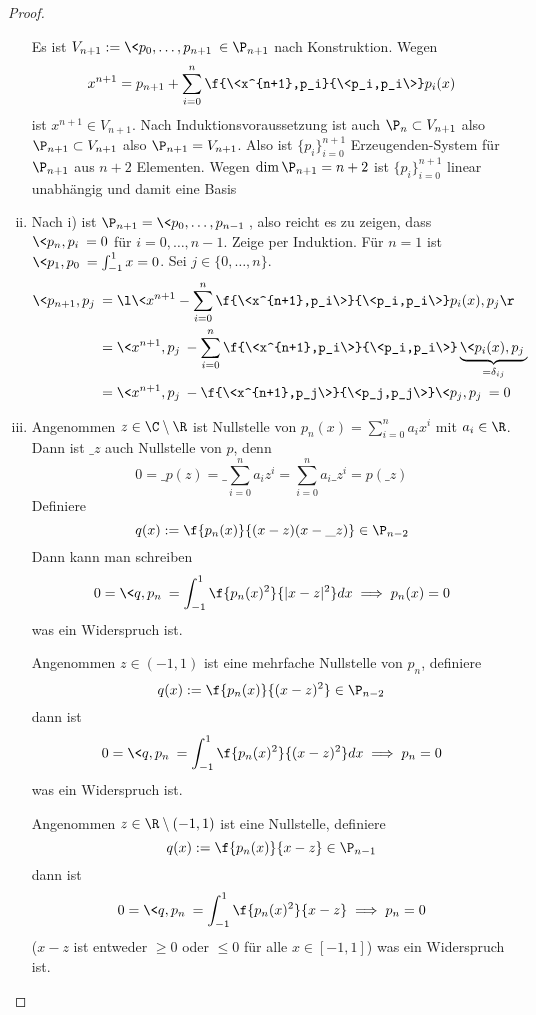 \documentclass[11pt]{scrbook}
\begin{document}
\begin{lem}
\begin{proof}
\begin{enumerate}[i)]
				Es ist $V_{n+1} := \<p_0,\dotsc,p_{n+1}\> \in \P_{n+1}$ nach Konstruktion.
				Wegen
				\[
					x^{n+1} = p_{n+1} + \sum_{i=0}^n \f {\<x^{n+1},p_i}{\<p_i,p_i\>} p_i(x)
				\]
				ist $x^{n+1} \in V_{n+1}$.
				Nach Induktionsvoraussetzung ist auch $\P_n \subset V_{n+1}$ also $\P_{n+1}\subset V_{n+1}$ also $\P_{n+1} = V_{n+1}$.
				Also ist $\{p_i\}_{i=0}^{n+1}$ Erzeugenden-System für $\P_{n+1}$ aus $n+2$ Elementen.
				Wegen $\dim \P_{n+1} = n+2$ ist $\{p_i\}_{i=0}^{n+1}$ linear unabhängig und damit eine Basis
			\item
				Nach i) ist $\P_{n+1} = \<p_0,\dotsc, p_{n-1}\>$, also reicht es zu zeigen, dass $\<p_n,p_i\>=0$ für $i=0,\dotsc, n-1$.
				Zeige per Induktion.
				Für $n=1$ ist $\<p_1,p_0\> = \int_{-1}^1 x = 0$.
				Sei $j\in \{0,\dotsc,n\}$.
				\begin{align*}
					\<p_{n+1},p_j\> 
					&= \l\< x^{n+1}- \sum_{i=0}^n \f {\<x^{n+1},p_i\>}{\<p_i,p_i\>} p_i(x) , p_j\r\> \\
					&= \<x^{n+1},p_j\> - \sum_{i=0}^n \f{\<x^{n+1},p_i\>}{\<p_i,p_i\>} \underbrace{\<p_i(x),p_j\> }_{= \delta_{ij}} \\
					&= \<x^{n+1},p_j\> - \f {\<x^{n+1},p_j\>}{\<p_j,p_j\>} \<p_j,p_j\> = 0
				\end{align*}
			\item
				Angenommen $z\in \C\setminus \R$ ist Nullstelle von $p_n(x) = \sum_{i=0}^n a_i x^i$ mit $a_i\in \R$.
				Dann ist $\_z$ auch Nullstelle von $p$, denn
				\[
					0 = \_{p(z)} = \_{\sum_{i=0}^n a_i z^i} = \sum_{i=0}^n a_i\_{z}^i = p(\_z)
				\]
				Definiere
				\[
					q(x) := \f {p_n(x)}{(x-z)(x-\_z)} \in \P_{n-2}
				\]
				Dann kann man schreiben
				\[
					0 = \<q,p_n\> = \int_{-1}^1 \f {p_n(x)^2}{|x-z|^2} dx \implies p_n(x) = 0
				\]
				was ein Widerspruch ist.

				Angenommen $z\in (-1,1)$ ist eine mehrfache Nullstelle von $p_n$, definiere
				\[
					q(x) := \f {p_n(x)}{(x-z)^2} \in \P_{n-2}
				\]
				dann ist
				\[
					0= \<q,p_n\> = \int_{-1}^1 \f {p_n(x)^2}{(x-z)^2} dx  \implies p_n = 0
				\]
				was ein Widerspruch ist.

				Angenommen $z\in \R\setminus (-1,1)$ ist eine Nullstelle, definiere
				\[
					q(x) := \f {p_n(x)}{x-z} \in \P_{n-1}
				\]
				dann ist
				\[
					0 = \<q,p_n\> = \int_{-1}^1 \f{p_n(x)^2}{x-z} \implies p_n = 0
				\]
				($x-z$ ist entweder $\ge 0$ oder $\le 0$ für alle $x\in [-1,1]$)
				was ein Widerspruch ist.


		\end{enumerate}
	\end{proof}
\end{lem}
\end{document}
